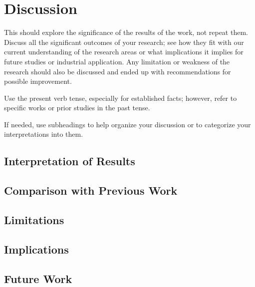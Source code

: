 \chapter{Discussion}

This should explore the significance of the results of the work, not repeat them. Discuss all the significant outcomes of your research; see how they fit with our current understanding of the research areas or what implications it implies for future studies or industrial application. Any limitation or weakness of the research should also be discussed and ended up with recommendations for possible improvement.

Use the present verb tense, especially for established facts; however, refer to specific works or prior studies in the past tense.

If needed, use subheadings to help organize your discussion or to categorize your interpretations into them. 


\section{Interpretation of Results}


\section{Comparison with Previous Work}


\section{Limitations}


\section{Implications}


\section{Future Work}


